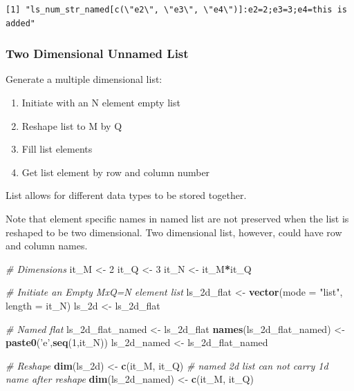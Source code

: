 \documentclass[
]{book}
\newenvironment{Shaded}{\begin{snugshade}}{\end{snugshade}}
\newcommand{\CommentTok}[1]{\textcolor[rgb]{0.56,0.35,0.01}{\textit{#1}}}
\newcommand{\DataTypeTok}[1]{\textcolor[rgb]{0.13,0.29,0.53}{#1}}
\newcommand{\DecValTok}[1]{\textcolor[rgb]{0.00,0.00,0.81}{#1}}
\newcommand{\KeywordTok}[1]{\textcolor[rgb]{0.13,0.29,0.53}{\textbf{#1}}}
\newcommand{\NormalTok}[1]{#1}
\newcommand{\OperatorTok}[1]{\textcolor[rgb]{0.81,0.36,0.00}{\textbf{#1}}}
\newcommand{\StringTok}[1]{\textcolor[rgb]{0.31,0.60,0.02}{#1}}
\providecommand{\tightlist}{%
  \setlength{\itemsep}{0pt}\setlength{\parskip}{0pt}}
\begin{document}
\begin{verbatim}
[1] "ls_num_str_named[c(\"e2\", \"e3\", \"e4\")]:e2=2;e3=3;e4=this is added"
\end{verbatim}

\hypertarget{two-dimensional-unnamed-list}{%
\subsubsection{Two Dimensional Unnamed List}\label{two-dimensional-unnamed-list}}

Generate a multiple dimensional list:

\begin{enumerate}
\def\labelenumi{\arabic{enumi}.}
\tightlist
\item
  Initiate with an N element empty list
\item
  Reshape list to M by Q
\item
  Fill list elements
\item
  Get list element by row and column number
\end{enumerate}

List allows for different data types to be stored together.

Note that element specific names in named list are not preserved when the list is reshaped to be two dimensional. Two dimensional list, however, could have row and column names.

\begin{Shaded}
\begin{Highlighting}[]
\CommentTok{# Dimensions}
\NormalTok{it_M <-}\StringTok{ }\DecValTok{2}
\NormalTok{it_Q <-}\StringTok{ }\DecValTok{3}
\NormalTok{it_N <-}\StringTok{ }\NormalTok{it_M}\OperatorTok{*}\NormalTok{it_Q}

\CommentTok{# Initiate an Empty MxQ=N element list}
\NormalTok{ls_2d_flat <-}\StringTok{ }\KeywordTok{vector}\NormalTok{(}\DataTypeTok{mode =} \StringTok{"list"}\NormalTok{, }\DataTypeTok{length =}\NormalTok{ it_N)}
\NormalTok{ls_2d <-}\StringTok{ }\NormalTok{ls_2d_flat}

\CommentTok{# Named flat}
\NormalTok{ls_2d_flat_named <-}\StringTok{ }\NormalTok{ls_2d_flat}
\KeywordTok{names}\NormalTok{(ls_2d_flat_named) <-}\StringTok{ }\KeywordTok{paste0}\NormalTok{(}\StringTok{'e'}\NormalTok{,}\KeywordTok{seq}\NormalTok{(}\DecValTok{1}\NormalTok{,it_N))}
\NormalTok{ls_2d_named <-}\StringTok{ }\NormalTok{ls_2d_flat_named}

\CommentTok{# Reshape}
\KeywordTok{dim}\NormalTok{(ls_2d) <-}\StringTok{ }\KeywordTok{c}\NormalTok{(it_M, it_Q)}
\CommentTok{# named 2d list can not carry 1d name after reshape}
\KeywordTok{dim}\NormalTok{(ls_2d_named) <-}\StringTok{ }\KeywordTok{c}\NormalTok{(it_M, it_Q)}
\end{Highlighting}
\end{Shaded}
\end{document}

